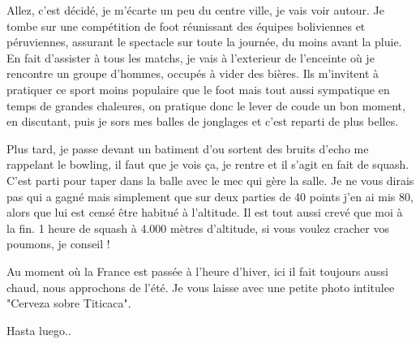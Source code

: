 \begin{multicols}{2}

Allez, c'est décidé, je m'écarte un peu du centre ville, je vais voir autour. Je tombe sur une compétition de foot réunissant des équipes boliviennes et péruviennes, assurant le spectacle sur toute la journée, du moins avant la pluie. En fait d'assister à tous les matchs, je vais à l'exterieur de l'enceinte où je rencontre un groupe d'hommes, occupés à vider des bières. Ils m'invitent à pratiquer ce sport moins populaire que le foot mais tout aussi sympatique en temps de grandes chaleures, on pratique donc le lever de coude un bon moment, en discutant, puis je sors mes balles de jonglages et c'est reparti de plus belles.


Plus tard, je passe devant un batiment d'ou sortent des bruits d'echo me rappelant le bowling, il faut que je vois ça, je rentre et il s'agit en fait de squash. C'est parti pour taper dans la balle avec le mec qui gère la salle. Je ne vous dirais pas qui a gagné mais simplement que sur deux parties de 40 points j'en ai mis 80, alors que lui est censé être habitué à l'altitude. Il est tout aussi crevé que moi à la fin. 1 heure de squash à 4.000 mètres d'altitude, si vous voulez cracher vos poumons, je conseil !

Au moment où la France est passée à l'heure d'hiver, ici il fait toujours aussi chaud, nous approchons de l'été. Je vous laisse avec une petite photo intitulee "Cerveza sobre Titicaca".


Hasta luego..

\end{multicols}


